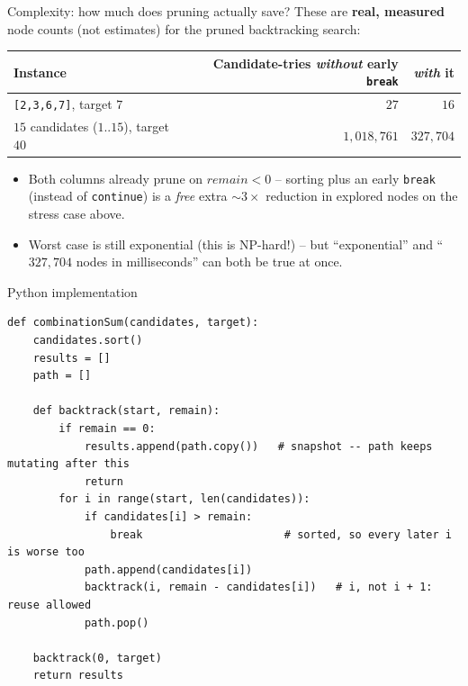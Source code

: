 \documentclass[11pt,aspectratio=169]{beamer}
\begin{document}
\begin{frame}{Complexity: how much does pruning actually save?}
  \small
  These are \textbf{real, measured} node counts (not estimates) for the pruned
  backtracking search:
  \begin{center}
  \begin{tabular}{@{}lrr@{}}
    \toprule
    Instance & Candidate-tries \emph{without} early \texttt{break} & \emph{with} it \\
    \midrule
    \texttt{[2,3,6,7]}, target $7$ & $27$ & $16$ \\
    $15$ candidates ($1..15$), target $40$ & $1{,}018{,}761$ & $327{,}704$ \\
    \bottomrule
  \end{tabular}
  \end{center}
  \begin{itemize}
    \item Both columns already prune on $remain < 0$ -- sorting plus an early
    \texttt{break} (instead of \texttt{continue}) is a \emph{free} extra $\sim 3\times$
    reduction in explored nodes on the stress case above.
    \item Worst case is still exponential (this is NP-hard!) -- but ``exponential''
    and ``$327{,}704$ nodes in milliseconds'' can both be true at once.
  \end{itemize}
\end{frame}

\begin{frame}[fragile]{Python implementation}
  \begin{lstlisting}[style=py,aboveskip=0pt,belowskip=0pt]
def combinationSum(candidates, target):
    candidates.sort()
    results = []
    path = []

    def backtrack(start, remain):
        if remain == 0:
            results.append(path.copy())   # snapshot -- path keeps mutating after this
            return
        for i in range(start, len(candidates)):
            if candidates[i] > remain:
                break                      # sorted, so every later i is worse too
            path.append(candidates[i])
            backtrack(i, remain - candidates[i])   # i, not i + 1: reuse allowed
            path.pop()

    backtrack(0, target)
    return results
  \end{lstlisting}
\end{frame}
\end{document}
